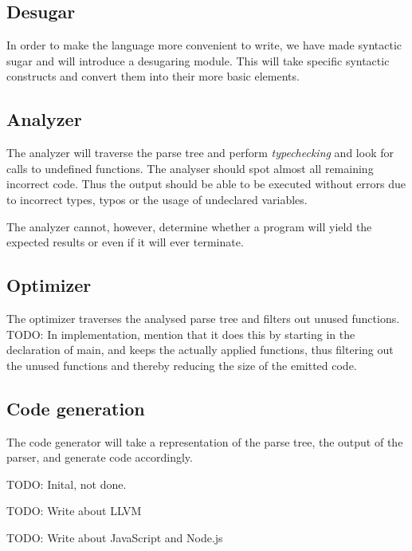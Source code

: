 \subsection{Desugar}
In order to make the language more convenient to write, we have made syntactic sugar and will introduce a desugaring module. This will take specific syntactic constructs and convert them into their more basic elements.

\subsection{Analyzer}
The analyzer will traverse the parse tree and perform \emph{typechecking} and look for calls to undefined functions. The analyser should spot almost all remaining incorrect code. Thus the output should be able to be executed without errors due to incorrect types, typos or the usage of undeclared variables.

The analyzer cannot, however, determine whether a program will yield the expected results or even if it will ever terminate.


\subsection{Optimizer}
The optimizer traverses the analysed parse tree and filters out unused functions. 
TODO: In implementation, mention that it does this by starting in the declaration of main, and keeps the actually applied functions, thus filtering out the unused functions and thereby reducing the size of the emitted code. 


\subsection{Code generation}
The code generator will take a representation of the
parse tree, the output of the parser, and generate code
accordingly. 


TODO: Inital, not done.

TODO: Write about LLVM

TODO: Write about JavaScript and Node.js
